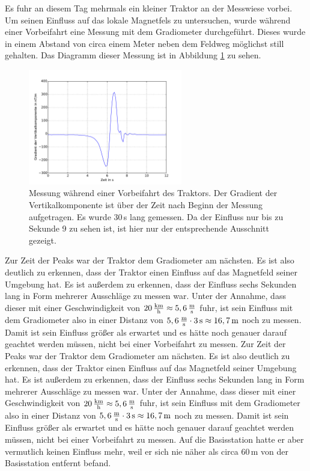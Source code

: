 Es fuhr an diesem Tag mehrmals ein kleiner Traktor an der Messwiese vorbei. Um seinen Einfluss auf das lokale Magnetfels zu untersuchen, wurde während einer Vorbeifahrt eine Messung mit dem Gradiometer durchgeführt. Dieses wurde in einem Abstand von circa einem Meter neben dem Feldweg möglichst still gehalten. Das Diagramm dieser Messung ist in Abbildung \ref{fig:plot_traktor} zu sehen.

\begin{figure}[!ht]
 \centering
 \includegraphics[width=0.6\textwidth]{fig/traktor_ausschnitt.pdf}
 \caption[Messung während einer Vorbeifahrt des Traktors]{Messung während einer Vorbeifahrt des Traktors. Der Gradient der Vertikalkomponente ist über der Zeit nach Beginn der Messung aufgetragen. Es wurde 30\,s lang gemessen. Da der Einfluss nur bis zu Sekunde 9 zu sehen ist, ist hier nur der entsprechende Ausschnitt gezeigt.}
 \label{fig:plot_traktor}
\end{figure}


Zur Zeit der Peaks war der Traktor dem Gradiometer am nächsten. Es ist also deutlich zu erkennen, dass der Traktor einen Einfluss auf das Magnetfeld seiner Umgebung hat. Es ist außerdem zu erkennen, dass der Einfluss sechs Sekunden lang in Form mehrerer Ausschläge zu messen war. Unter der Annahme, dass dieser mit einer Geschwindigkeit von $20\,\frac{\mathrm{km}}{\mathrm{h}}\approx5,6\,\frac{\mathrm{m}}{\mathrm{s}}$ fuhr, ist sein Einfluss mit dem Gradiometer also in einer Distanz von $5,6\,\frac{\mathrm{m}}{\mathrm{s}}\cdot3\,\mathrm{s}\approx16,7\,\mathrm{m}$ noch zu messen. Damit ist sein Einfluss größer als erwartet und es hätte noch genauer darauf geachtet werden müssen, nicht bei einer Vorbeifahrt zu messen.
Zur Zeit der Peaks war der Traktor dem Gradiometer am nächsten. Es ist also deutlich zu erkennen, dass der Traktor einen Einfluss auf das Magnetfeld seiner Umgebung hat. Es ist außerdem zu erkennen, dass der Einfluss sechs Sekunden lang in Form mehrerer Ausschläge zu messen war. Unter der Annahme, dass dieser mit einer Geschwindigkeit von $20\,\frac{\mathrm{km}}{\mathrm{h}}\approx5,6\,\frac{\mathrm{m}}{\mathrm{s}}$ fuhr, ist sein Einfluss mit dem Gradiometer also in einer Distanz von $5,6\,\frac{\mathrm{m}}{\mathrm{s}}\cdot3\,\mathrm{s}\approx16,7\,\mathrm{m}$ noch zu messen. Damit ist sein Einfluss größer als erwartet und es hätte noch genauer darauf geachtet werden müssen, nicht bei einer Vorbeifahrt zu messen. Auf die Basisstation hatte er aber vermutlich keinen Einfluss mehr, weil er sich nie näher als circa 60\,m von der Basisstation entfernt befand.

